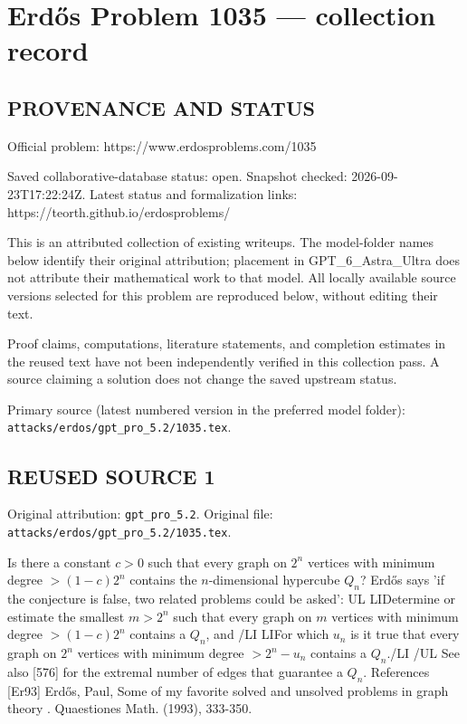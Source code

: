 \section*{Erd\H{o}s Problem 1035 --- collection record}

\subsection*{PROVENANCE AND STATUS}
Official problem: https://www.erdosproblems.com/1035

Saved collaborative-database status: open.
Snapshot checked: 2026-09-23T17:22:24Z.
Latest status and formalization links: https://teorth.github.io/erdosproblems/

This is an attributed collection of existing writeups. The model-folder names below identify their original attribution; placement in GPT\_6\_Astra\_Ultra does not attribute their mathematical work to that model. All locally available source versions selected for this problem are reproduced below, without editing their text.

Proof claims, computations, literature statements, and completion estimates in the reused text have not been independently verified in this collection pass. A source claiming a solution does not change the saved upstream status.

Primary source (latest numbered version in the preferred model folder): \texttt{attacks/erdos/gpt\_pro\_5.2/1035.tex}.

\subsection*{REUSED SOURCE 1}
Original attribution: \texttt{gpt\_pro\_5.2}.
Original file: \texttt{attacks/erdos/gpt\_pro\_5.2/1035.tex}.


Is there a constant $c>0$ such that every graph on $2^n$ vertices with minimum degree $>(1-c)2^n$ contains the $n$-dimensional hypercube $Q_n$? Erd\H{o}s \cite{Er93} says 'if the conjecture is false, two related problems could be asked': {UL} {LI}Determine or estimate the smallest $m>2^n$ such that every graph on $m$ vertices with minimum degree $>(1-c)2^n$ contains a $Q_n$, and {/LI} {LI}For which $u_n$ is it true that every graph on $2^n$ vertices with minimum degree $>2^n-u_n$ contains a $Q_n$.{/LI} {/UL} See also [576] for the extremal number of edges that guarantee a $Q_n$. References [Er93] Erd\H{o}s, Paul, Some of my favorite solved and unsolved problems in graph theory . Quaestiones Math. (1993), 333-350.



